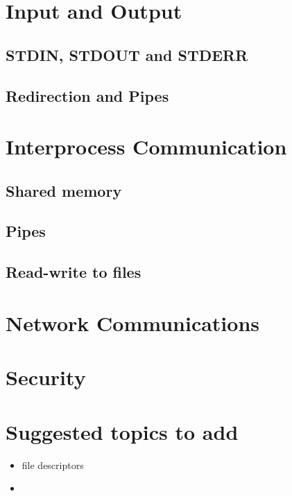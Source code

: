 \documentclass[12pt]{article}
\begin{document}
\section{Input and Output} 
\subsection{STDIN, STDOUT and STDERR}
\subsection{Redirection and Pipes}

\section{Interprocess Communication} 
\subsection{Shared memory}
\subsection{Pipes}
\subsection{Read-write to files}

\section{Network Communications} 

\section{Security} 

\section{Suggested topics to add}
\begin{itemize}
  \item file descriptors
  \item 
\end{itemize}
\end{document}
